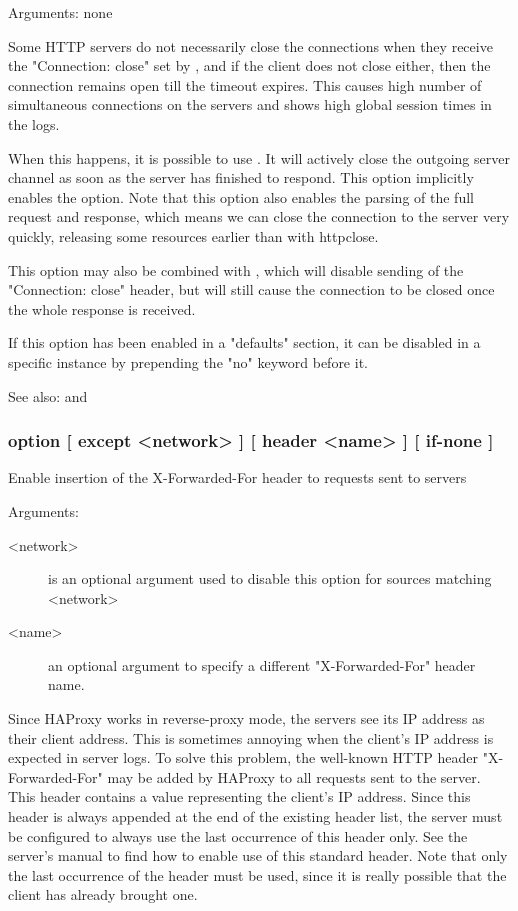 
  Arguments: none

  Some HTTP servers do not necessarily close the connections when they receive
  the "Connection: close" set by , and if the client does not
  close either, then the connection remains open till the timeout expires. This
  causes high number of simultaneous connections on the servers and shows high
  global session times in the logs.

  When this happens, it is possible to use . It will
  actively close the outgoing server channel as soon as the server has finished
  to respond. This option implicitly enables the  option. Note that
  this option also enables the parsing of the full request and response, which
  means we can close the connection to the server very quickly, releasing some
  resources earlier than with httpclose.

  This option may also be combined with , which
  will disable sending of the "Connection: close" header, but will still cause
  the connection to be closed once the whole response is received.

  If this option has been enabled in a "defaults" section, it can be disabled
  in a specific instance by prepending the "no" keyword before it.

  See also:  and 

\subsubsection[forwardfor]{option  [ except <network> ] [ header <name> ] [ if-none ]}

  Enable insertion of the X-Forwarded-For header to requests sent to servers


  Arguments:
\begin{description}
\item[<network>] is an optional argument used to disable this option for sources
              matching <network>
\item[<name>]    an optional argument to specify a different "X-Forwarded-For"
              header name.
\end{description}

  Since HAProxy works in reverse-proxy mode, the servers see its IP address as
  their client address. This is sometimes annoying when the client's IP address
  is expected in server logs. To solve this problem, the well-known HTTP header
  "X-Forwarded-For" may be added by HAProxy to all requests sent to the server.
  This header contains a value representing the client's IP address. Since this
  header is always appended at the end of the existing header list, the server
  must be configured to always use the last occurrence of this header only. See
  the server's manual to find how to enable use of this standard header. Note
  that only the last occurrence of the header must be used, since it is really
  possible that the client has already brought one.


